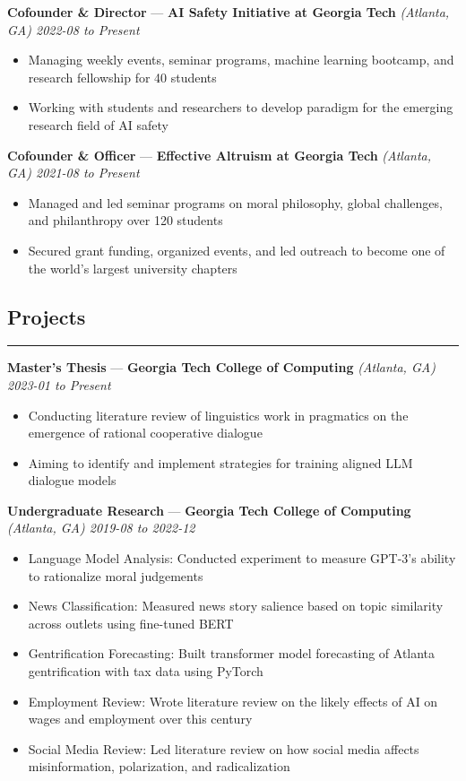\documentclass[10pt]{article}
\newcommand{\resumeHeading}[1]{
    \subsection*{#1}
    \hrule
    \vspace*{5pt}
}
\newcommand{\resumeSubHeading}[5]{
    \vspace*{5pt}
    \textbf{#1} — \textbf{#2} \textsl{(#3) \hfill #4 to #5}
}
\begin{document}
\resumeSubHeading
    {Cofounder \& Director}
    {AI Safety Initiative at Georgia Tech}
    {Atlanta, GA}
    {2022-08}
    {Present}
    \begin{itemize}
        \item Managing weekly events, seminar programs, machine learning bootcamp, and research fellowship for 40 students
        \item Working with students and researchers to develop paradigm for the emerging research field of AI safety
\end{itemize}

\resumeSubHeading
    {Cofounder \& Officer}
    {Effective Altruism at Georgia Tech}
    {Atlanta, GA}
    {2021-08}
    {Present}
\begin{itemize}
    \item Managed and led seminar programs on moral philosophy, global challenges, and philanthropy over 120 students
    \item Secured grant funding, organized events, and led outreach to become one of the world's largest university chapters
\end{itemize}



\resumeHeading{Projects \vspace{-2.5pt}}

\resumeSubHeading
    {Master's Thesis}
    {Georgia Tech College of Computing}
    {Atlanta, GA}
    {2023-01}
    {Present}
\begin{itemize}
    \item Conducting literature review of linguistics work in pragmatics on the emergence of rational cooperative dialogue
    \item Aiming to identify and implement strategies for training aligned LLM dialogue models
\end{itemize}

\resumeSubHeading
    {Undergraduate Research}
    {Georgia Tech College of Computing}
    {Atlanta, GA}
    {2019-08}
    {2022-12}
\begin{itemize}
    \item Language Model Analysis:
        Conducted experiment to measure GPT-3's ability to rationalize moral judgements
    \item News Classification:
        Measured news story salience based on topic similarity across outlets using fine-tuned BERT
    \item Gentrification Forecasting:
        Built transformer model forecasting of Atlanta gentrification with tax data using PyTorch
    \item Employment Review:
        Wrote literature review on the likely effects of AI on wages and employment over this century
    \item Social Media Review:
        Led literature review on how social media affects misinformation, polarization, and radicalization
\end{itemize}
\end{document}
